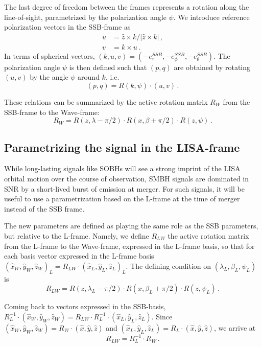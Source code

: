 \documentclass[aps,showpacs,twocolumn,prd,superscriptaddress,nofootinbib]{revtex4-1}
\newcommand{\be}{\begin{equation}}
\newcommand{\ee}{\end{equation}}
\newcommand{\bsub}{\begin{subequations}}
\newcommand{\esub}{\end{subequations}}
\begin{document}
The last degree of freedom between the frames represents a rotation along the line-of-sight, parametrized by the polarization angle $\psi$. We introduce reference polarization vectors in the SSB-frame as
\bsub
\begin{align}
	u &= \hat{z} \times k / |\hat{z} \times k| \,,\\
	v &= k \times u \,.
\end{align}
\esub
In terms of spherical vectors, $(k, u, v) = (-e_{r}^{SSB}, -e_{\phi}^{SSB}, -e_{\theta}^{SSB})$. The polarization angle $\psi$ is then defined such that $(p,q)$ are obtained by rotating $(u,v)$ by the angle $\psi$ around $k$, i.e.
\be
	(p,q) = R(k, \psi) \cdot (u,v) \,.
\ee

These relations can be summarized by the active rotation matrix $R_{W}$ from the SSB-frame to the Wave-frame:
\be\label{eq:RW}
	R_{W} = R(z, \lambda - \pi/2) \cdot R(x, \beta + \pi/2 ) \cdot R(z, \psi)\,.
\ee



\subsection{Parametrizing the signal in the LISA-frame}
\label{sec:LISAframeparams}

While long-lasting signals like SOBHs will see a strong imprint of the LISA orbital motion over the course of observation, SMBH signals are dominated in SNR by a short-lived burst of emission at merger. For such signals, it will be useful to use a parametrization based on the L-frame at the time of merger instead of the SSB frame.

The new parameters are defined as playing the same role as the SSB parameters, but relative to the L-frame. Namely, we define $R_{LW}$ the active rotation matrix from the L-frame to the Wave-frame, expressed in the L-frame basis, so that for each basis vector expressed in the L-frame basis $(\hat{x}_{W}, \hat{y}_{W}, \hat{z}_{W})_{L} = R_{LW} \cdot (\hat{x}_{L}, \hat{y}_{L}, \hat{z}_{L})_{L}$. The defining condition on $(\lambda_{L}, \beta_{L}, \psi_{L})$ is
\be\label{eq:defRLW}
	R_{LW} = R(z, \lambda_{L} - \pi/2) \cdot R(x, \beta_{L} + \pi/2 ) \cdot R(z, \psi_{L}) \,.
\ee

Coming back to vectors expressed in the SSB-basis, $R_{L}^{-1} \cdot (\hat{x}_{W}, \hat{y}_{W}, \hat{z}_{W}) = R_{LW} \cdot R_{L}^{-1} \cdot (\hat{x}_{L}, \hat{y}_{L}, \hat{z}_{L})$. Since $ (\hat{x}_{W}, \hat{y}_{W}, \hat{z}_{W}) = R_{W} \cdot (\hat{x}, \hat{y}, \hat{z})$ and $ (\hat{x}_{L}, \hat{y}_{L}, \hat{z}_{L}) = R_{L} \cdot (\hat{x}, \hat{y}, \hat{z})$, we arrive at
\be\label{eq:RLW}
	R_{LW} = R_{L}^{-1} \cdot R_{W} \,.
\ee
\end{document}
